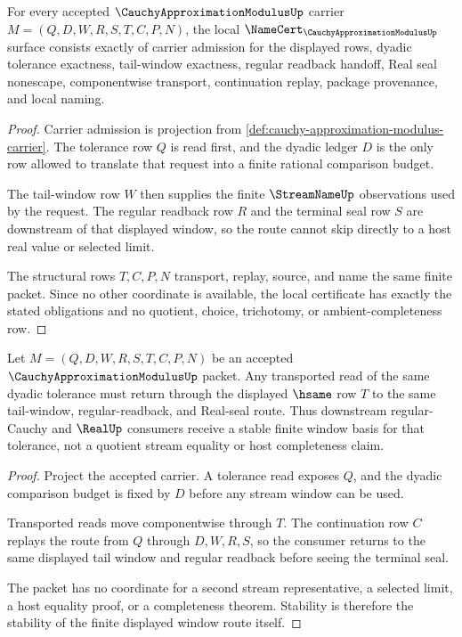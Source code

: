 \begin{theorem}\label{thm:cauchy-approximation-modulus-namecert-obligations}
For every accepted $\CauchyApproximationModulusUp$ carrier $M=(Q,D,W,R,S,T,C,P,N)$, the local $\NameCert_{\CauchyApproximationModulusUp}$ surface consists exactly of carrier admission for the displayed rows, dyadic tolerance exactness, tail-window exactness, regular readback handoff, Real seal nonescape, componentwise transport, continuation replay, package provenance, and local naming.
\end{theorem}
\begin{proof}
Carrier admission is projection from \autoref{def:cauchy-approximation-modulus-carrier}. The tolerance row $Q$ is read first, and the dyadic ledger $D$ is the only row allowed to translate that request into a finite rational comparison budget.

The tail-window row $W$ then supplies the finite $\StreamNameUp$ observations used by the request. The regular readback row $R$ and the terminal seal row $S$ are downstream of that displayed window, so the route cannot skip directly to a host real value or selected limit.

The structural rows $T,C,P,N$ transport, replay, source, and name the same finite packet. Since no other coordinate is available, the local certificate has exactly the stated obligations and no quotient, choice, trichotomy, or ambient-completeness row.
\end{proof}

\begin{theorem}\label{thm:cauchy-approximation-modulus-window-stability}
Let $M=(Q,D,W,R,S,T,C,P,N)$ be an accepted $\CauchyApproximationModulusUp$ packet. Any transported read of the same dyadic tolerance must return through the displayed $\hsame$ row $T$ to the same tail-window, regular-readback, and Real-seal route. Thus downstream regular-Cauchy and $\RealUp$ consumers receive a stable finite window basis for that tolerance, not a quotient stream equality or host completeness claim.
\end{theorem}
\begin{proof}
Project the accepted carrier. A tolerance read exposes $Q$, and the dyadic comparison budget is fixed by $D$ before any stream window can be used.

Transported reads move componentwise through $T$. The continuation row $C$ replays the route from $Q$ through $D,W,R,S$, so the consumer returns to the same displayed tail window and regular readback before seeing the terminal seal.

The packet has no coordinate for a second stream representative, a selected limit, a host equality proof, or a completeness theorem. Stability is therefore the stability of the finite displayed window route itself.
\end{proof}

